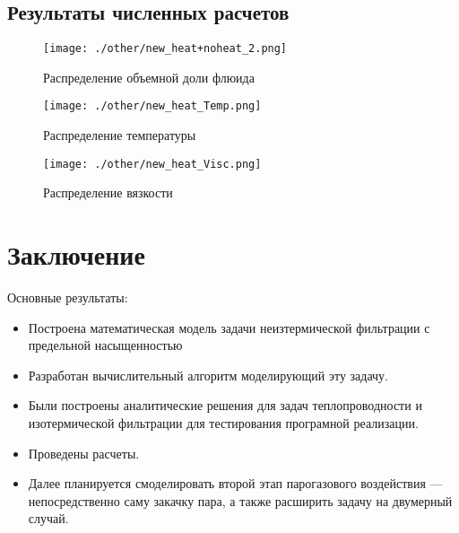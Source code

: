\documentclass[12pt,a4paper]{article}
\begin{document}
\subsection{Результаты численных расчетов}

\begin{figure}[h!]
\begin{center}
\texttt{[image: ./other/new\_heat+noheat\_2.png]}
\caption{Распределение объемной доли флюида}
\end{center}
\end{figure}

\begin{figure}[h!]
\begin{center}
\texttt{[image: ./other/new\_heat\_Temp.png]}
\caption{Распределение температуры}
\end{center}
\end{figure}

\begin{figure}[h!]
\begin{center}
\texttt{[image: ./other/new\_heat\_Visc.png]}
\caption{Распределение вязкости}
\end{center}
\end{figure}
\section{Заключение}
Основные результаты:
\begin{itemize}
\item Построена математическая модель задачи неизтермической фильтрации с предельной насыщенностью
\item Разработан вычислительный алгоритм моделирующий эту задачу.
\item Были построены аналитические решения для задач теплопроводности и изотермической фильтрации для тестирования програмной реализации.
\item Проведены расчеты.
\item Далее планируется смоделировать второй этап парогазового воздействия --- непосредственно саму закачку пара, а также расширить задачу на двумерный случай. 
\end{itemize}
\newpage
 
 
\end{document}
